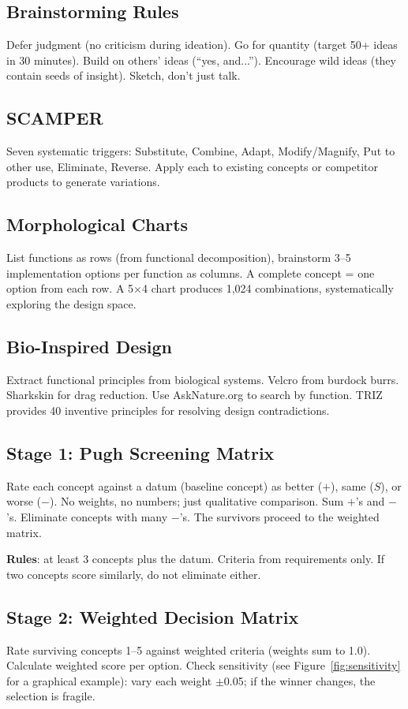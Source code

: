 \subsection{Brainstorming Rules}
Defer judgment (no criticism during ideation). Go for quantity (target 50+ ideas in 30 minutes). Build on others' ideas (``yes, and...''). Encourage wild ideas (they contain seeds of insight). Sketch, don't just talk.

\subsection{SCAMPER}
Seven systematic triggers: Substitute, Combine, Adapt, Modify/Magnify, Put to other use, Eliminate, Reverse. Apply each to existing concepts or competitor products to generate variations.

\subsection{Morphological Charts}
List functions as rows (from functional decomposition), brainstorm 3--5 implementation options per function as columns. A complete concept = one option from each row. A 5$\times$4 chart produces 1,024 combinations, systematically exploring the design space.

\subsection{Bio-Inspired Design}
Extract functional principles from biological systems. Velcro from burdock burrs. Sharkskin for drag reduction. Use AskNature.org to search by function. TRIZ provides 40 inventive principles for resolving design contradictions.


\subsection{Stage 1: Pugh Screening Matrix}
Rate each concept against a datum (baseline concept) as better ($+$), same ($S$), or worse ($-$). No weights, no numbers; just qualitative comparison. Sum $+$'s and $-$'s. Eliminate concepts with many $-$'s. The survivors proceed to the weighted matrix.

\textbf{Rules}: at least 3 concepts plus the datum. Criteria from requirements only. If two concepts score similarly, do not eliminate either.

\subsection{Stage 2: Weighted Decision Matrix}
Rate surviving concepts 1--5 against weighted criteria (weights sum to 1.0). Calculate weighted score per option. Check sensitivity (see Figure~\ref{fig:sensitivity} for a graphical example): vary each weight $\pm$0.05; if the winner changes, the selection is fragile.

